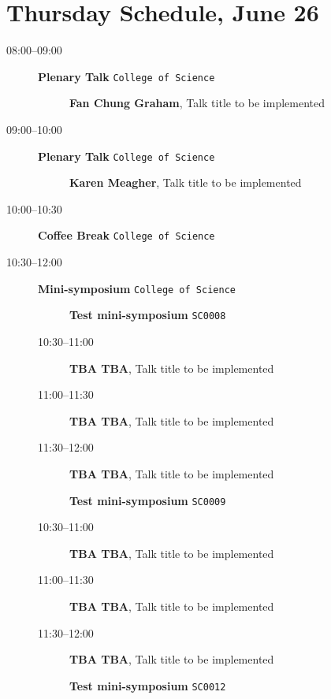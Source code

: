 \documentclass[ILAS2025-program.tex]{subfiles}
\begin{document}
\section{Thursday Schedule, June 26}
    
    \begin{description}
    \item[08:00--09:00] \textbf{Plenary Talk} {\footnotesize\texttt{College of Science}}
    \begin{description}
        \item[] \textbf{Fan Chung Graham}, Talk title to be implemented
        \end{description}
        \item[09:00--10:00] \textbf{Plenary Talk} {\footnotesize\texttt{College of Science}}
    \begin{description}
        \item[] \textbf{Karen Meagher}, Talk title to be implemented
        \end{description}
        \item[10:00--10:30] \textbf{Coffee Break} {\footnotesize\texttt{College of Science}}
    \item[10:30--12:00] \textbf{Mini-symposium} {\footnotesize\texttt{College of Science}}
    \begin{description}
    \item[] \textbf{Test mini-symposium} {\footnotesize\texttt{SC0008}}
    \item[10:30--11:00] \textbf{TBA TBA}, Talk title to be implemented
        \item[11:00--11:30] \textbf{TBA TBA}, Talk title to be implemented
        \item[11:30--12:00] \textbf{TBA TBA}, Talk title to be implemented
        \end{description}
    \begin{description}
    \item[] \textbf{Test mini-symposium} {\footnotesize\texttt{SC0009}}
    \item[10:30--11:00] \textbf{TBA TBA}, Talk title to be implemented
        \item[11:00--11:30] \textbf{TBA TBA}, Talk title to be implemented
        \item[11:30--12:00] \textbf{TBA TBA}, Talk title to be implemented
        \end{description}
    \begin{description}
    \item[] \textbf{Test mini-symposium} {\footnotesize\texttt{SC0012}}

\end{description}
\end{description}
\end{document}

